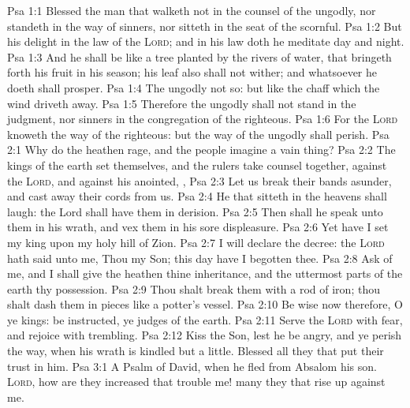 \vs Psa 1:1 Blessed  the man that walketh not in the counsel of the ungodly, nor standeth in the way of sinners, nor sitteth in the seat of the scornful.
\vs Psa 1:2 But his delight  in the law of the \textsc{Lord}; and in his law doth he meditate day and night.
\vs Psa 1:3 And he shall be like a tree planted by the rivers of water, that bringeth forth his fruit in his season; his leaf also shall not wither; and whatsoever he doeth shall prosper.
\vs Psa 1:4 The ungodly  not so: but  like the chaff which the wind driveth away.
\vs Psa 1:5 Therefore the ungodly shall not stand in the judgment, nor sinners in the congregation of the righteous.
\vs Psa 1:6 For the \textsc{Lord} knoweth the way of the righteous: but the way of the ungodly shall perish.
\vs Psa 2:1 Why do the heathen rage, and the people imagine a vain thing?
\vs Psa 2:2 The kings of the earth set themselves, and the rulers take counsel together, against the \textsc{Lord}, and against his anointed, ,
\vs Psa 2:3 Let us break their bands asunder, and cast away their cords from us.
\vs Psa 2:4 He that sitteth in the heavens shall laugh: the Lord shall have them in derision.
\vs Psa 2:5 Then shall he speak unto them in his wrath, and vex them in his sore displeasure.
\vs Psa 2:6 Yet have I set my king upon my holy hill of Zion.
\vs Psa 2:7 I will declare the decree: the \textsc{Lord} hath said unto me, Thou  my Son; this day have I begotten thee.
\vs Psa 2:8 Ask of me, and I shall give  the heathen  thine inheritance, and the uttermost parts of the earth  thy possession.
\vs Psa 2:9 Thou shalt break them with a rod of iron; thou shalt dash them in pieces like a potter's vessel.
\vs Psa 2:10 Be wise now therefore, O ye kings: be instructed, ye judges of the earth.
\vs Psa 2:11 Serve the \textsc{Lord} with fear, and rejoice with trembling.
\vs Psa 2:12 Kiss the Son, lest he be angry, and ye perish  the way, when his wrath is kindled but a little. Blessed  all they that put their trust in him.
\vs Psa 3:1 A Psalm of David, when he fled from Absalom his son. \textsc{Lord}, how are they increased that trouble me! many  they that rise up against me.
